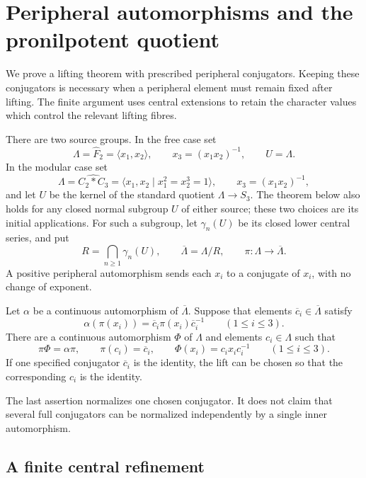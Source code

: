 \section{Peripheral automorphisms and the pronilpotent quotient}
\label{sec:peripheral-lifting}

We prove a lifting theorem with prescribed peripheral conjugators.
Keeping these conjugators is necessary when a peripheral element must
remain fixed after lifting. The finite argument uses central extensions
to retain the character values which control the relevant lifting fibres.

There are two source groups. In the free case set
\[
 \Lambda=\widehat F_2=\langle x_1,x_2\rangle,
 \qquad x_3=(x_1x_2)^{-1},\qquad U=\Lambda.
\]
In the modular case set
\[
 \Lambda=\widehat{C_2*C_3}
     =\langle x_1,x_2\mid x_1^2=x_2^3=1\rangle,
 \qquad x_3=(x_1x_2)^{-1},
\]
and let $U$ be the kernel of the standard quotient $\Lambda\to S_3$.
The theorem below also holds for any closed normal subgroup $U$ of
either source; these two choices are its initial applications.
For such a subgroup, let $\gamma_n(U)$ be its closed lower central series,
and put
\[
 R=\bigcap_{n\geq1}\gamma_n(U),\qquad
 \overline\Lambda=\Lambda/R,
 \qquad \pi:\Lambda\longrightarrow\overline\Lambda.
\]
A positive peripheral automorphism sends each $x_i$ to a conjugate of
$x_i$, with no change of exponent.

\begin{theorem}\label{thm:peripheral-lifting}
Let $\alpha$ be a continuous automorphism of $\overline\Lambda$.
Suppose that elements $\overline c_i\in\overline\Lambda$ satisfy
\[
 \alpha(\pi(x_i))
    =\overline c_i\pi(x_i)\overline c_i^{-1}
       \qquad(1\leq i\leq3).
\]
There are a continuous automorphism $\Phi$ of $\Lambda$ and elements
$c_i\in\Lambda$ such that
\[
 \pi\Phi=\alpha\pi,
 \qquad \pi(c_i)=\overline c_i,
 \qquad \Phi(x_i)=c_ix_ic_i^{-1}
       \qquad(1\leq i\leq3).
\]
If one specified conjugator $\overline c_i$ is the identity, the lift
can be chosen so that the corresponding $c_i$ is the identity.
\end{theorem}

The last assertion normalizes one chosen conjugator. It does not claim
that several full conjugators can be normalized independently by a
single inner automorphism.

\subsection{A finite central refinement}

